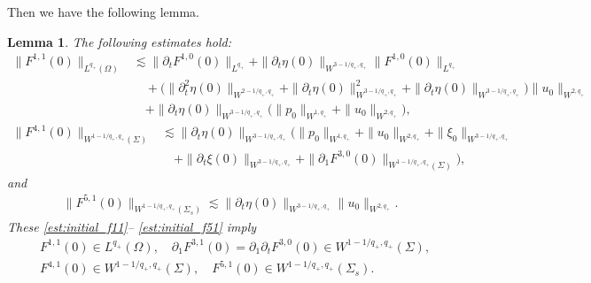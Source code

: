\documentclass[letterpaper,reqno,10pt,twoside]{amsart}
\newtheorem{lemma}[theorem]{Lemma}
\theoremstyle{definition}
\theoremstyle{remark}
\def\p{\partial}
\def\Om{\Omega}
\begin{document}
\begin{appendix}
			Then we have the following lemma.
			\begin{lemma}\label{lem:initial_force1}
				The following estimates hold:
				\begin{equation}\label{est:initial_f11}
					\begin{aligned}
						\|F^{1,1}(0)\|_{L^{q_+}(\Om)}&\lesssim \|\p_tF^{1,0}(0)\|_{L^{q_+}}+\|\p_t\eta(0)\|_{W^{3-1/q_+,q_+}}\|F^{1,0}(0)\|_{L^{q_+}}\\
						&\quad +\big(\|\p_t^2\eta(0)\|_{W^{2-1/q_+,q_+}}+\|\p_t\eta(0)\|_{W^{3-1/q_+,q_+}}^2+\|\p_t\eta(0)\|_{W^{3-1/q_+,q_+}}\big)\|u_0\|_{W^{2,q_+}}\\
						&\quad+\|\p_t\eta(0)\|_{W^{3-1/q_+,q_+}}\big(\|p_0\|_{W^{1,q_+}}+\|u_0\|_{W^{2,q_+}}\big),
					\end{aligned}
				\end{equation}
				\begin{equation}\label{est:initial_f41}
					\begin{aligned}
						\|F^{4,1}(0)\|_{W^{1-1/q_+, q_+}(\Sigma)}&\lesssim\|\p_t\eta(0)\|_{W^{3-1/q_+,q_+}}\big(\|p_0\|_{W^{1,q_+}}+\|u_0\|_{W^{2,q_+}}+\|\xi_0\|_{W^{3-1/q_+,q_+}}\\
						&\quad+\|\p_t\xi(0)\|_{W^{3-1/q_+,q_+}}+\|\p_1F^{3,0}(0)\|_{W^{1-1/q_+, q_+}(\Sigma)}\big),
					\end{aligned}
				\end{equation}
				and
				\begin{equation}\label{est:initial_f51}
					\begin{aligned}
						\|F^{5,1}(0)\|_{W^{1-1/q_+, q_+}(\Sigma_s)}\lesssim \|\p_t\eta(0)\|_{W^{3-1/q_+,q_+}}\|u_0\|_{W^{2, q_+}}.
					\end{aligned}
				\end{equation}
				These \eqref{est:initial_f11}-- \eqref{est:initial_f51} imply
				\[
				\begin{aligned}
					&F^{1,1}(0)\in L^{q_+}(\Om),\quad \p_1F^{3,1}(0)=\p_1\p_tF^{3,0}(0)\in W^{1-1/q_+, q_+}(\Sigma),\\
					&F^{4,1}(0)\in W^{1-1/q_+, q_+}(\Sigma),\quad F^{5,1}(0)\in W^{1-1/q_+, q_+}(\Sigma_s).
				\end{aligned}
				\]
				

\end{lemma}
\end{appendix}
\end{document}
